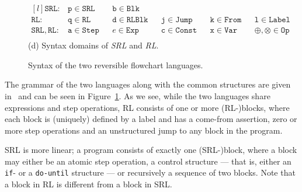 \begin{figure}[ht]
  \begin{minipage}{\textwidth}
    \center
    $$\begin{matrix*}[l]
      \mathtt{SRL}:     & \mathtt{p}\in\mathtt{SRL}  & & \mathtt{b}\in\mathtt{Blk}\\
      \mathtt{RL}:      & \mathtt{q}\in\mathtt{RL}   & & \mathtt{d}\in\mathtt{RLBlk} & & \mathtt{j}\in\mathtt{Jump}  & & \mathtt{k}\in\mathtt{From} & & \mathtt{l}\in\mathtt{Label}\\
      \mathtt{SRL, RL}: & \mathtt{a}\in\mathtt{Step} & &  e\in\mathtt{Exp}   & & \mathtt{c}\in\mathtt{Const} & & \mathtt{x}\in\mathtt{Var}  & & \oplus,\otimes\in\mathtt{Op}\\
    \end{matrix*}$$
    (d) Syntax domains of \textit{SRL} and \textit{RL}.
  \end{minipage}

  \caption{Syntax of the two reversible flowchart languages.}
  \label{fig:rl_srl_grammar_and_structure}

\end{figure}

The grammar of the two languages along with the common structures are given in~\cite{REV} and can be seen in Figure~\ref{fig:rl_srl_grammar_and_structure}. As we see, while the two languages share expressions and step operations, RL consists of one or more (RL-)blocks, where each block is (uniquely) defined by a label and has a come-from assertion, zero or more step operations and an unstructured jump to any block in the program.

SRL is more linear; a program consists of exactly one (SRL-)block, where a block may either be an atomic step operation, a control structure --- that is, either an \texttt{if}- or a \texttt{do-until} structure --- or recursively a sequence of two blocks. Note that a block in RL is different from a block in SRL.\

